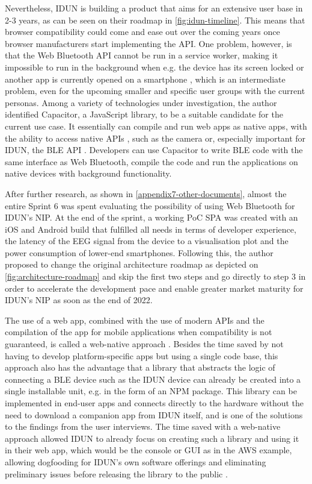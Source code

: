Nevertheless, IDUN is building a product that aims for an extensive user base in 2-3 years, as can be seen on their roadmap in \autoref{fig:idun-timeline}. This means that browser compatibility could come and ease out over the coming years once browser manufacturers start implementing the API. One problem, however, is that the Web Bluetooth API cannot be run in a service worker, making it impossible to run in the background when e.g. the device has its screen locked or another app is currently opened on a smartphone \citep{webbluetoothcg_service_2018}, which is an intermediate problem, even for the upcoming smaller and specific user groups with the current personas. Among a variety of technologies under investigation, the author identified Capacitor, a JavaScript library, to be a suitable candidate for the current use case. It essentially can compile and run web apps as native apps, with the ability to access native APIs \citep{ionic_capacitor_nodate}, such as the camera or, especially important for IDUN, the BLE API \citep{capacitor-community_capacitor-communitybluetooth-_2022}. Developers can use Capacitor to write BLE code with the same interface as Web Bluetooth, compile the code and run the applications on native devices with background functionality.

After further research, as shown in \autoref{appendix7-other-documents}, almost the entire Sprint 6 was spent evaluating the possibility of using Web Bluetooth for IDUN's NIP. At the end of the sprint, a working PoC SPA was created with an iOS and Android build that fulfilled all needs in terms of developer experience, the latency of the EEG signal from the device to a visualisation plot and the power consumption of lower-end smartphones. Following this, the author proposed to change the original architecture roadmap as depicted on \autoref{fig:architecture-roadmap} and skip the first two steps and go directly to step 3 in order to accelerate the development pace and enable greater market maturity for IDUN's NIP as soon as the end of 2022.

The use of a web app, combined with the use of modern APIs and the compilation of the app for mobile applications when compatibility is not guaranteed, is called a web-native approach \citep{ionic_web_nodate}. Besides the time saved by not having to develop platform-specific apps but using a single code base, this approach also has the advantage that a library that abstracts the logic of connecting a BLE device such as the IDUN device can already be created into a single installable unit, e.g. in the form of an NPM package. This library can be implemented in end-user apps and connects directly to the hardware without the need to download a companion app from IDUN itself, and is one of the solutions to the findings from the user interviews. The time saved with a web-native approach allowed IDUN to already focus on creating such a library and using it in their web app, which would be the console or GUI as in the AWS example, allowing dogfooding for IDUN's own software offerings and eliminating preliminary issues before releasing the library to the public \citep{techopedia_what_2016}.

